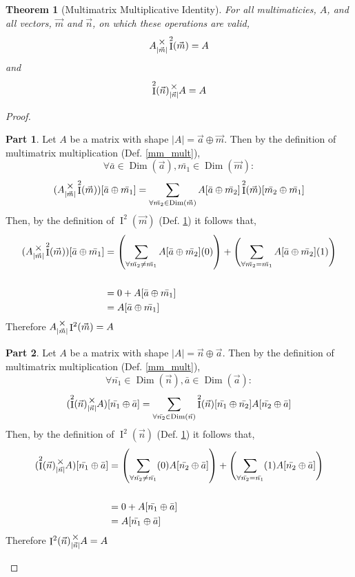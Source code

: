 \documentclass[12pt]{book}
\theoremstyle{plain}
\newtheorem{theorem}{Theorem}[chapter]
\theoremstyle{definition}
\theoremstyle{ppart}
\newtheorem{ppart}{Part}
\theoremstyle{case}
\theoremstyle{solution}
\DeclareMathOperator{\Dim}{Dim}
\DeclareMathOperator{\Ident}{I}
\newcommand{\mmult}[1]{\text{\raisebox{1ex}{$\underset{#1}{\times}$}}}
\begin{document}
\begin{theorem}[Multimatrix Multiplicative Identity]
\label{mm_ident}
For all multimaticies, $A$, and all vectors, $\vec{m}$ and $\vec{n}$,  on which
these operations are valid,
\[
 A \mmult{|\vec{m}|} \Ident^2(\vec{m}) = A
\]
and
\[
 \Ident^2(\vec{n}) \mmult{|\vec{n}|} A = A
\]
\end{theorem}
\begin{proof}
\begin{ppart}
Let $A$ be a matrix with shape $|A| = \vec{a} \oplus \vec{m}$.
Then by the definition of multimatrix multiplication (Def. \ref{mm_mult}),
\[ \forall \bar{a} \in \Dim(\vec{a}), \bar{m_1} \in \Dim(\vec{m}) : \]
\[
 (A \mmult{|\vec{m}|} \Ident^2(\vec{m}))[\bar{a} \oplus \bar{m_1}]
 =
 \sum_{\forall \bar{m_2} \in \Dim(\vec{m})}
 A[\bar{a} \oplus \bar{m_2}] \Ident^2(\vec{m})[\bar{m_2} \oplus \bar{m_1}]
\]
Then, by the definition of $\Ident^2(\vec{m})$ (Def. \ref{mm_ident}) it follows
that,
\begin{align*}
 (A \mmult{|\vec{m}|} \Ident^2(\vec{m}))[\bar{a} \oplus \bar{m_1}]
 &=
 \left(
  \sum_{\forall \bar{m_2} \ne \bar{m_1}}
  A[\bar{a} \oplus \bar{m_2}] (0)
 \right)
 +
 \left(
  \sum_{\forall \bar{m_2} = \bar{m_1}}
  A[\bar{a} \oplus \bar{m_2}] (1)
 \right) \\
 \\
 &= 0 + A[\bar{a} \oplus \bar{m_1}] \\
 &= A[\bar{a} \oplus \bar{m_1}]
\end{align*}
Therefore $A \mmult{|\vec{m}|} \Ident^2(\vec{m}) = A$
\end{ppart}
\begin{ppart}
Let $A$ be a matrix with shape $|A| = \vec{n} \oplus \vec{a}$.
Then by the definition of multimatrix multiplication (Def. \ref{mm_mult}),
\[ \forall  \bar{n_1} \in \Dim(\vec{n}), \bar{a} \in \Dim(\vec{a}) : \]
\[
 (\Ident^2(\vec{n}) \mmult{|\vec{n}|} A)[\bar{n_1} \oplus \bar{a}]
 =
 \sum_{\forall \bar{n_2} \in \Dim(\vec{n})}
 \Ident^2(\vec{n})[\bar{n_1} \oplus \bar{n_2}]A[\bar{n_2} \oplus \bar{a}] 
\]
Then, by the definition of $\Ident^2(\vec{n})$ (Def. \ref{mm_ident}) it follows
that,
\begin{align*}
 (\Ident^2(\vec{n}) \mmult{|\vec{n}|} A)[\bar{n_1} \oplus \bar{a}]
 &=
 \left(
  \sum_{\forall \bar{n_2} \ne \bar{n_1}}
  (0) A[\bar{n_2} \oplus \bar{a}]
 \right)
 +
 \left(
  \sum_{\forall \bar{n_2} = \bar{n_1}}
  (1) A[\bar{n_2} \oplus \bar{a}]
 \right) \\
 \\
 &= 0 + A[\bar{n_1} \oplus \bar{a}] \\
 &= A[\bar{n_1} \oplus \bar{a}]
\end{align*}
Therefore $\Ident^2(\vec{n}) \mmult{|\vec{n}|} A = A$
\end{ppart}
\end{proof}
\end{document}
